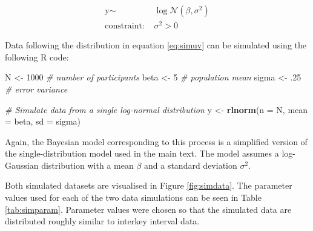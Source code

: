 \documentclass[
  man,floatsintext]{apa7}
\newenvironment{Shaded}{\begin{snugshade}}{\end{snugshade}}
\newcommand{\AttributeTok}[1]{\textcolor[rgb]{0.13,0.29,0.53}{#1}}
\newcommand{\CommentTok}[1]{\textcolor[rgb]{0.56,0.35,0.01}{\textit{#1}}}
\newcommand{\DecValTok}[1]{\textcolor[rgb]{0.00,0.00,0.81}{#1}}
\newcommand{\FunctionTok}[1]{\textcolor[rgb]{0.13,0.29,0.53}{\textbf{#1}}}
\newcommand{\NormalTok}[1]{#1}
\newcommand{\OtherTok}[1]{\textcolor[rgb]{0.56,0.35,0.01}{#1}}
\begin{document}
\begin{equation}
\begin{aligned}
\label{eq:simuv}
\text{y} \sim\text{ }& \log\mathcal{N}(\beta, \sigma^2)\\
\text{constraint: } & \sigma^2>0
\end{aligned}
\end{equation}

Data following the distribution in equation \ref{eq:simuv} can be simulated using the following R code:

\begin{Shaded}
\begin{Highlighting}[]
\NormalTok{N }\OtherTok{\textless{}{-}} \DecValTok{1000} \CommentTok{\# number of participants}
\NormalTok{beta }\OtherTok{\textless{}{-}} \DecValTok{5} \CommentTok{\# population mean}
\NormalTok{sigma }\OtherTok{\textless{}{-}}\NormalTok{ .}\DecValTok{25} \CommentTok{\# error variance}

\CommentTok{\# Simulate data from a single log{-}normal distribution}
\NormalTok{y }\OtherTok{\textless{}{-}} \FunctionTok{rlnorm}\NormalTok{(}\AttributeTok{n =}\NormalTok{ N, }\AttributeTok{mean =}\NormalTok{ beta, }\AttributeTok{sd =}\NormalTok{ sigma)}
\end{Highlighting}
\end{Shaded}

Again, the Bayesian model corresponding to this process is a simplified version of the single-distribution model used in the main text. The model assumes a log-Gaussian distribution with a mean \(\beta\) and a standard deviation \(\sigma^2\).

Both simulated datasets are visualised in Figure \ref{fig:simdata}. The parameter values used for each of the two data simulations can be seen in Table \ref{tab:simparam}. Parameter values were chosen so that the simulated data are distributed roughly similar to interkey interval data.
\end{document}
